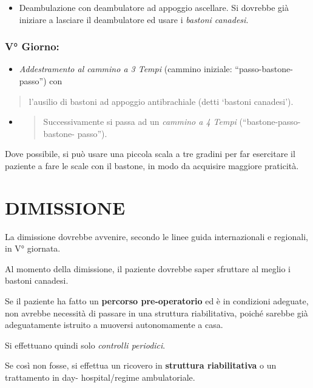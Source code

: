 \documentclass[]{article}
\begin{document}
\begin{itemize}
\item
  Deambulazione con deambulatore ad appoggio ascellare. Si dovrebbe già
  iniziare a lasciare il deambulatore ed usare i \emph{bastoni
  canadesi}.
\end{itemize}

\subsubsection{V° Giorno:}\label{v-giorno}

\begin{itemize}
\item
  \emph{Addestramento al cammino a 3 Tempi} (cammino iniziale:
  ``passo-bastone-passo'') con
\end{itemize}

\begin{quote}
l'ausilio di bastoni ad appoggio antibrachiale (detti `bastoni
canadesi').
\end{quote}

\begin{itemize}
\item
  \begin{quote}
  Successivamente si passa ad un \emph{cammino a 4 Tempi}
  (``bastone-passo-bastone- passo'').
  \end{quote}
\end{itemize}

Dove possibile, si può usare una piccola scala a tre gradini per far
esercitare il paziente a fare le scale con il bastone, in modo da
acquisire maggiore praticità.

\section{DIMISSIONE}\label{dimissione}

La dimissione dovrebbe avvenire, secondo le linee guida internazionali e
regionali, in V° giornata.

Al momento della dimissione, il paziente dovrebbe saper sfruttare al
meglio i bastoni canadesi.

Se il paziente ha fatto un \textbf{percorso pre-operatorio} ed è in
condizioni adeguate, non avrebbe necessità di passare in una struttura
riabilitativa, poiché sarebbe già adeguatamente istruito a muoversi
autonomamente a casa.

Si effettuano quindi solo \emph{controlli periodici}.

Se così non fosse, si effettua un ricovero in \textbf{struttura
riabilitativa} o un trattamento in day- hospital/regime ambulatoriale.
\end{document}
